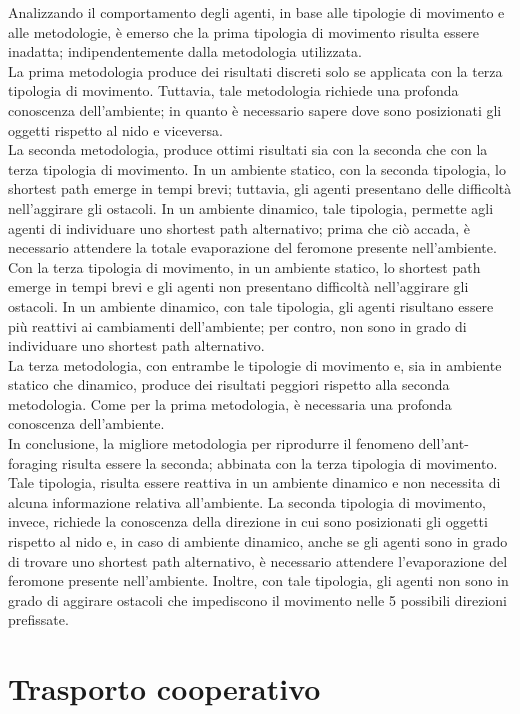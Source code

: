 \documentclass[12pt,a4paper,openright,twoside]{report}
\begin{document}
Analizzando il comportamento degli agenti, in base alle tipologie di movimento e alle metodologie, è emerso che la prima tipologia di movimento risulta essere inadatta; indipendentemente dalla metodologia utilizzata.\\
La prima metodologia produce dei risultati discreti solo se applicata con la terza tipologia di movimento. Tuttavia, tale metodologia richiede una profonda conoscenza dell'ambiente; in quanto è necessario sapere dove sono posizionati gli oggetti rispetto al nido e viceversa.\\
La seconda metodologia, produce ottimi risultati sia con la seconda che con la terza tipologia di movimento. In un ambiente statico, con la seconda tipologia, lo shortest path emerge in tempi brevi; tuttavia, gli agenti presentano delle difficoltà nell'aggirare gli ostacoli. In un ambiente dinamico, tale tipologia, permette agli agenti di individuare uno shortest path alternativo; prima che ciò accada, è necessario attendere la totale evaporazione del feromone presente nell'ambiente. Con la terza tipologia di movimento, in un ambiente statico, lo shortest path emerge in tempi brevi e gli agenti non presentano difficoltà nell'aggirare gli ostacoli. In un ambiente dinamico, con tale tipologia, gli agenti risultano essere più reattivi ai cambiamenti dell'ambiente; per contro, non sono in grado di individuare uno shortest path alternativo.\\
La terza metodologia, con entrambe le tipologie di movimento e, sia in ambiente statico che dinamico, produce dei risultati peggiori rispetto alla seconda metodologia. Come per la prima metodologia, è necessaria una profonda conoscenza dell'ambiente.\\
In conclusione, la migliore metodologia per riprodurre il fenomeno dell'ant-foraging risulta essere la seconda; abbinata con la terza tipologia di movimento. Tale tipologia, risulta essere reattiva in un ambiente dinamico e non necessita di alcuna informazione relativa all'ambiente. La seconda tipologia di movimento, invece, richiede la conoscenza della direzione in cui sono posizionati gli oggetti rispetto al nido e, in caso di ambiente dinamico, anche se gli agenti sono in grado di trovare uno shortest path alternativo, è necessario attendere l'evaporazione del feromone presente nell'ambiente. Inoltre, con tale tipologia, gli agenti non sono in grado di aggirare ostacoli che impediscono il movimento nelle 5 possibili direzioni prefissate.

\section{Trasporto cooperativo}
\end{document}
